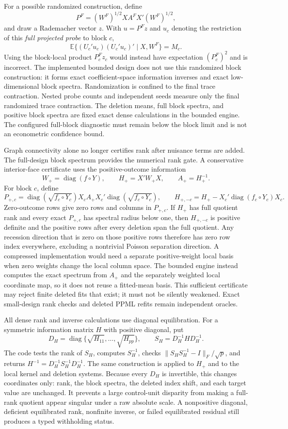 \documentclass[11pt]{article}
\newcommand{\diag}{\operatorname{diag}}
\newcommand{\E}{\mathbb E}
\begin{document}
For a possible randomized construction, define
\[
 P^F=(W^F)^{1/2}XA^FX'(W^F)^{1/2},
\]
and draw a Rademacher vector $z$. With
$u=P^Fz$ and $u_c$ denoting the restriction of this \emph{full projected
probe} to block $c$,
\[
 \E\{(U_c'u_c)(U_c'u_c)'\mid X,W^F\}=M_c.
\]
Using the block-local product $P_c^Fz_c$ would instead have expectation
$(P_c^F)^2$ and is incorrect. The implemented bounded design does not use
this randomized block construction: it forms exact coefficient-space
information inverses and exact low-dimensional block spectra. Randomization
is confined to the final trace contraction.
Nested probe counts and independent seeds measure only the final randomized
trace contraction. The deletion means, full block spectra, and positive block
spectra are fixed exact dense calculations in the bounded engine. The
configured full-block diagnostic must remain below the block limit and is not
an econometric confidence bound.

Graph connectivity alone no longer certifies rank after nuisance terms are
added. The full-design block spectrum provides the numerical rank gate. A
conservative interior-face certificate uses the positive-outcome information
\[
 W_+=\diag(f\circ Y),\qquad H_+=X'W_+X,\qquad A_+=H_+^{-1}.
\]
For block $c$, define
\[
 P_{+,c}=\diag(\sqrt{f_c\circ Y_c})X_cA_+X_c'
           \diag(\sqrt{f_c\circ Y_c}),
 \qquad
 H_{+,-c}=H_+-X_c'\diag(f_c\circ Y_c)X_c .
\]
Zero-outcome rows give zero rows and columns in $P_{+,c}$. If $H_+$ has full
quotient rank and every exact $P_{+,c}$ has spectral radius below one, then
$H_{+,-c}$ is positive definite and the positive rows after every deletion
span the full quotient. Any recession direction that is zero on those
positive rows therefore has zero row index everywhere, excluding a nontrivial
Poisson separation direction. A compressed implementation would need a
separate positive-weight local basis when zero weights change the local
column space. The bounded engine instead computes the exact spectrum from
$A_+$ and the separately weighted local coordinate map, so it does not reuse a fitted-mean
basis. This sufficient certificate may reject finite deleted fits that exist;
it must not be silently weakened. Exact small-design rank checks and deleted
PPML refits remain independent oracles.

All dense rank and inverse calculations use diagonal equilibration. For a
symmetric information matrix $H$ with positive diagonal, put
\[
 D_H=\diag\{\sqrt{H_{11}},\ldots,\sqrt{H_{pp}}\},\qquad
 S_H=D_H^{-1}HD_H^{-1}.
\]
The code tests the rank of $S_H$, computes $S_H^{-1}$, checks
$\lVert S_HS_H^{-1}-I\rVert_F/\sqrt p$, and returns
$H^{-1}=D_H^{-1}S_H^{-1}D_H^{-1}$. The same construction is applied to
$H_+$ and to the local kernel and deletion systems. Because every $D_H$ is
invertible, this changes coordinates only: rank, the block spectra, the
deleted index shift, and each target value are unchanged. It prevents a
large control-unit disparity from making a full-rank quotient appear singular
under a raw absolute scale. A nonpositive diagonal, deficient equilibrated
rank, nonfinite inverse, or failed equilibrated residual still produces a
typed withholding status.
\end{document}
